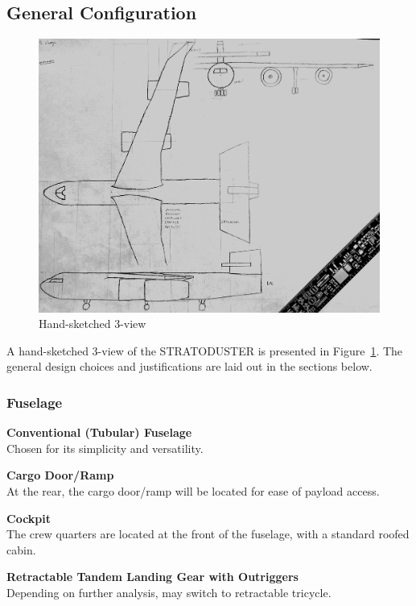 \documentclass[12pt]{article}
\newcounter{enumine}
\begin{document}
\subsection{General Configuration}
\begin{figure}
	\centering
	\includegraphics[width=.9\textwidth]{handsketch}
	\caption{Hand-sketched 3-view}
	\label{fig:sketch}
\end{figure}

A hand-sketched 3-view of the STRATODUSTER is presented in Figure~\ref{fig:sketch}.
The general design choices and justifications are laid out in the sections below.
\subsubsection{Fuselage}
\begin{compactenum}
	\item \textbf{Conventional (Tubular) Fuselage} \\ Chosen for its simplicity and versatility.
	\item \textbf{Cargo Door/Ramp} \\ At the rear, the cargo door/ramp will be located for ease of payload access.
	\item \textbf{Cockpit} \\ The crew quarters are located at the front of the fuselage, with a standard roofed cabin.
	\item \textbf{Retractable Tandem Landing Gear with Outriggers} \\ Depending on further analysis, may switch to retractable tricycle.
\setcounter{enumine}{\value{enumi}}
\end{compactenum}
\end{document}
